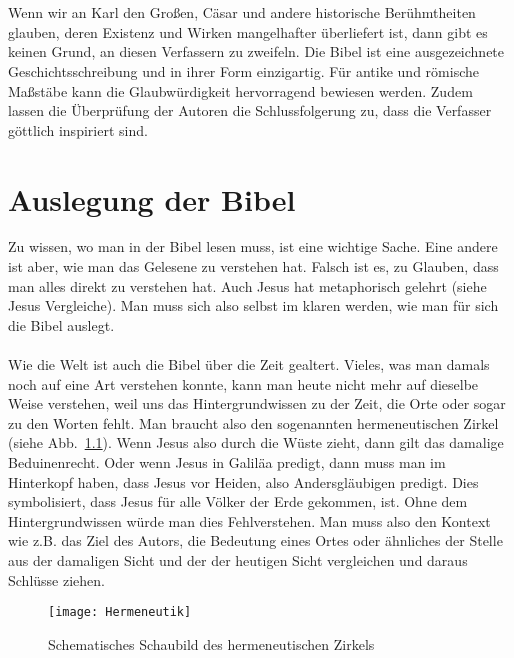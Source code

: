 \\~\\
Wenn wir an Karl den Großen, Cäsar und andere historische Berühmtheiten glauben, deren Existenz und Wirken mangelhafter überliefert ist, dann gibt es keinen Grund, an diesen Verfassern zu zweifeln. Die Bibel ist eine ausgezeichnete Geschichtsschreibung und in ihrer Form einzigartig. Für antike und römische Maßstäbe kann die Glaubwürdigkeit hervorragend bewiesen werden. Zudem lassen die Überprüfung der Autoren die Schlussfolgerung zu, dass die Verfasser göttlich inspiriert sind.


\chapter{Auslegung der Bibel}
Zu wissen, wo man in der Bibel lesen muss, ist eine wichtige Sache. Eine andere ist aber, wie man das Gelesene zu verstehen hat. Falsch ist es,  zu Glauben, dass man alles direkt zu verstehen hat. Auch Jesus hat metaphorisch gelehrt (siehe Jesus Vergleiche). Man muss sich also selbst im klaren werden, wie man für sich die Bibel auslegt.
\\~\\
Wie die Welt ist auch die Bibel über die Zeit gealtert. Vieles, was man damals noch auf eine Art verstehen konnte, kann man heute nicht mehr auf dieselbe Weise verstehen, weil uns das Hintergrundwissen zu der Zeit, die Orte oder sogar zu den Worten fehlt. Man braucht also den sogenannten hermeneutischen Zirkel (siehe Abb.\ \ref{Hermeneutik}). Wenn Jesus also durch die Wüste zieht, dann gilt das damalige Beduinenrecht. Oder wenn Jesus in Galiläa predigt, dann muss man im Hinterkopf haben, dass Jesus vor Heiden, also Andersgläubigen predigt. Dies symbolisiert, dass Jesus für alle Völker der Erde gekommen, ist. Ohne dem Hintergrundwissen würde man dies Fehlverstehen. Man muss also den Kontext wie z.B. das Ziel des Autors, die Bedeutung eines Ortes oder ähnliches der Stelle aus der damaligen Sicht und der der heutigen Sicht vergleichen und daraus Schlüsse ziehen.
\begin{figure}[h]
    \begin{center}
        \texttt{[image: Hermeneutik]}
        \caption{Schematisches Schaubild des hermeneutischen Zirkels}\label{Hermeneutik}
    \end{center}
\end{figure}
\pagebreak
